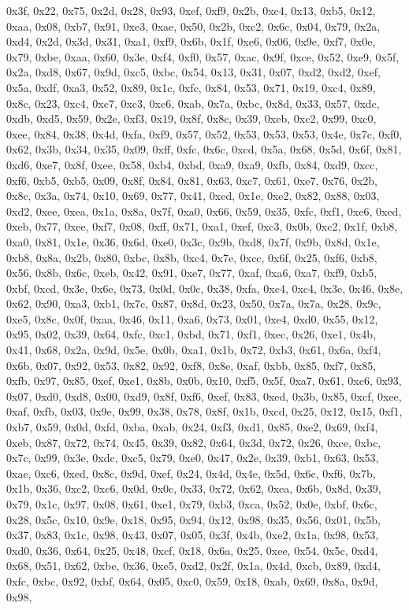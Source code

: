 \documentclass[
]{book}
\begin{document}
0x3f, 0x22, 0x75, 0x2d, 0x28, 0x93, 0xef, 0xf9, 0x2b, 0xc4, 0x13, 0xb5, 0x12, 0xaa, 0x08, 0xb7, 0x91, 0xe3, 0xae, 0x50, 0x2b, 0xc2, 0x6c, 0x04, 0x79, 0x2a, 0xd4, 0x2d, 0x3d, 0x31, 0xa1, 0xf9, 0x6b, 0x1f, 0xe6, 0x06, 0x9e, 0xf7, 0x0e, 0x79, 0xbe, 0xaa, 0x60, 0x3e, 0xf4, 0xf0, 0x57, 0xac, 0x9f, 0xce, 0x52, 0xe9, 0x5f, 0x2a, 0xd8, 0x67, 0x9d, 0xc5, 0xbc, 0x54, 0x13, 0x31, 0x07, 0xd2, 0xd2, 0xef, 0x5a, 0xdf, 0xa3, 0x52, 0x89, 0x1c, 0xfc, 0x84, 0x53, 0x71, 0x19, 0xc4, 0x89, 0x8c, 0x23, 0xc4, 0xc7, 0xc3,
0xc6, 0xab, 0x7a, 0xbc, 0x8d, 0x33, 0x57, 0xdc, 0xdb, 0xd5, 0x59, 0x2e, 0xf3, 0x19, 0x8f, 0x8c, 0x39, 0xeb, 0xc2, 0x99, 0xc0, 0xee, 0x84, 0x38, 0x4d, 0xfa, 0xf9, 0x57, 0x52, 0x53, 0x53, 0x53, 0x4e, 0x7c, 0xf0, 0x62, 0x3b, 0x34, 0x35, 0x09, 0xff, 0xfc, 0x6c, 0xcd, 0x5a, 0x68, 0x5d, 0x6f, 0x81, 0xd6, 0xe7, 0x8f, 0xee, 0x58, 0xb4, 0xbd, 0xa9, 0xa9, 0xfb, 0x84, 0xd9, 0xcc, 0xf6, 0xb5, 0xb5, 0x09, 0x8f, 0x84, 0x81, 0x63, 0xc7, 0x61, 0xe7, 0x76, 0x2b, 0x8c, 0x3a, 0x74, 0x10, 0x69, 0x77, 0x41, 0xed, 0x1e,
0xe2, 0x82, 0x88, 0x03, 0xd2, 0xee, 0xea, 0x1a, 0x8a, 0x7f, 0xa0, 0x66, 0x59, 0x35, 0xfc, 0xf1, 0xe6, 0xed, 0xeb, 0x77, 0xee, 0xf7, 0x08, 0xff, 0x71, 0xa1, 0xef, 0xc3, 0x0b, 0xc2, 0x1f, 0xb8, 0xa0, 0x81, 0x1e, 0x36, 0x6d, 0xe0, 0x3c, 0x9b, 0xd8, 0x7f, 0x9b, 0x8d, 0x1e, 0xb8, 0x8a, 0x2b, 0x80, 0xbc, 0x8b, 0xc4, 0x7e, 0xcc, 0x6f, 0x25, 0xf6, 0xb8, 0x56, 0x8b, 0x6c, 0xeb, 0x42, 0x91, 0xe7, 0x77, 0xaf, 0xa6, 0xa7, 0xf9, 0xb5, 0xbf, 0xcd, 0x3e, 0x6e, 0x73, 0x0d, 0x0c, 0x38, 0xfa, 0xc4, 0xc4, 0x3e, 0x46,
0x8e, 0x62, 0x90, 0xa3, 0xb1, 0x7c, 0x87, 0x8d, 0x23, 0x50, 0x7a, 0x7a, 0x28, 0x9c, 0xe5, 0x8c, 0x0f, 0xaa, 0x46, 0x11, 0xa6, 0x73, 0x01, 0xe4, 0xd0, 0x55, 0x12, 0x95, 0x02, 0x39, 0x64, 0xfc, 0xc1, 0xbd, 0x71, 0xf1, 0xec, 0x26, 0xe1, 0x4b, 0x41, 0x68, 0x2a, 0x9d, 0x5e, 0x0b, 0xa1, 0x1b, 0x72, 0xb3, 0x61, 0x6a, 0xf4, 0x6b, 0x07, 0x92, 0x53, 0x82, 0x92, 0xf8, 0x8e, 0xaf, 0xbb, 0x85, 0xf7, 0x85, 0xfb, 0x97, 0x85, 0xef, 0xe1, 0x8b, 0x0b, 0x10, 0xf5, 0x5f, 0xa7, 0x61, 0xc6, 0x93, 0x07, 0xd0, 0xd8, 0x00,
0xd9, 0x8f, 0xf6, 0xef, 0x83, 0xed, 0x3b, 0x85, 0xcf, 0xee, 0xaf, 0xfb, 0x03, 0x9e, 0x99, 0x38, 0x78, 0x8f, 0x1b, 0xcd, 0x25, 0x12, 0x15, 0xf1, 0xb7, 0x59, 0x0d, 0xfd, 0xba, 0xab, 0x24, 0xf3, 0xd1, 0x85, 0xe2, 0x69, 0xf4, 0xeb, 0x87, 0x72, 0x74, 0x45, 0x39, 0x82, 0x64, 0x3d, 0x72, 0x26, 0xce, 0xbc, 0x7c, 0x99, 0x3e, 0xdc, 0xc5, 0x79, 0xe0, 0x47, 0x2e, 0x39, 0xb1, 0x63, 0x53, 0xae, 0xc6, 0xed, 0x8c, 0x9d, 0xef, 0x24, 0x4d, 0x4e, 0x5d, 0x6c, 0xf6, 0x7b, 0x1b, 0x36, 0xc2, 0xc6, 0x0d, 0x0c, 0x33, 0x72,
0x62, 0xea, 0x6b, 0x8d, 0x39, 0x79, 0x1c, 0x97, 0x08, 0x61, 0xe1, 0x79, 0xb3, 0xca, 0x52, 0x0e, 0xbf, 0x6c, 0x28, 0x5c, 0x10, 0x9e, 0x18, 0x95, 0x94, 0x12, 0x98, 0x35, 0x56, 0x01, 0x5b, 0x37, 0x83, 0x1c, 0x98, 0x43, 0x07, 0x05, 0x3f, 0x4b, 0xe2, 0x1a, 0x98, 0x53, 0xd0, 0x36, 0x64, 0x25, 0x48, 0xcf, 0x18, 0x6a, 0x25, 0xee, 0x54, 0x5c, 0xd4, 0x68, 0x51, 0x62, 0xbe, 0x36, 0xe5, 0xd2, 0x2f, 0x1a, 0x4d, 0xcb, 0x89, 0xd4, 0xfc, 0xbc, 0x92, 0xbf, 0x64, 0x05, 0xc0, 0x59, 0x18, 0xab, 0x69, 0x8a, 0x9d, 0x98,
\end{document}
